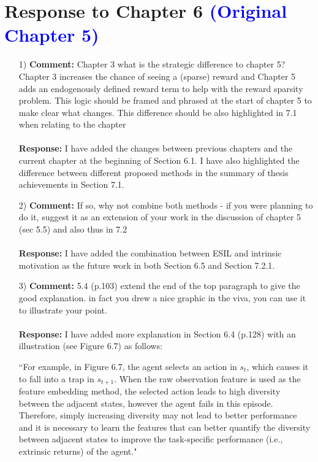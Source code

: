 \documentclass[11pt]{article}
\begin{document}
\section*{Response to Chapter 6 \textcolor{blue}{(Original Chapter 5)}}
\begin{enumerate}
\item[1)] \textbf{Comment:} Chapter 3 what is the strategic difference to chapter 5?
Chapter 3 increases the chance of seeing a (sparse) reward and Chapter 5 adds an endogenously defined reward term to help with the reward sparsity problem. This logic should be framed and phrased at the start of chapter 5 to make clear what changes. This difference should be also highlighted in 7.1 when relating to the chapter\\ \\
\textbf{Response:} I have added the changes between previous chapters and the current chapter at the beginning of Section 6.1. I have also highlighted the difference between different proposed methods in the summary of thesis achievements in Section 7.1.

\item[2)] \textbf{Comment:} If so, why not combine both methods - if you were planning to do it, suggest it as an extension of your work in the discussion of chapter 5 (sec 5.5) and also thus in 7.2\\ \\
\textbf{Response:} I have added the combination between ESIL and intrinsic motivation as the future work in both Section 6.5 and Section 7.2.1.

\item[3)] \textbf{Comment:} 5.4 (p.103) extend the end of the top paragraph to give the good explanation. in fact you drew a nice graphic in the viva, you can use it to illustrate your point.\\ \\
\textbf{Response:} I have added more explanation in Section 6.4 ({p.128}) with an illustration (see Figure 6.7) as follows:

``For example, in Figure 6.7, the agent selects an action in $s_{t}$, which causes it to fall into a trap in $s_{t+1}$. When the raw observation feature is used as the feature embedding method, the selected action leads to high diversity between the adjacent states, however the agent fails in this episode. Therefore, simply increasing diversity may not lead to better performance and it is necessary to learn the features that can better quantify the diversity between adjacent states to improve the task-specific performance (i.e., extrinsic returns) of the agent."


\end{enumerate}
\end{document}
